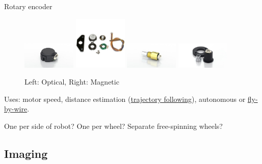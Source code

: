\documentclass{beamer}
\begin{document}
\begin{frame}[shrink]{Rotary encoder}
\begin{figure}[width=\textwidth]
\includegraphics[width=1in]{OpticalEncoder}
\includegraphics[width=1in]{OpticalEncoder2}
\includegraphics[width=1in]{MagneticEncoder}
\includegraphics[width=1in]{MagneticEncoder2}
\caption{Left: Optical, Right: Magnetic}
\end{figure}

Uses: motor speed, distance estimation (\underline{trajectory following}), 
autonomous or 
\underline{fly-by-wire}.

One per side of robot? One per wheel? Separate free-spinning wheels?
\end{frame}

\subsection{Imaging}
\end{document}
